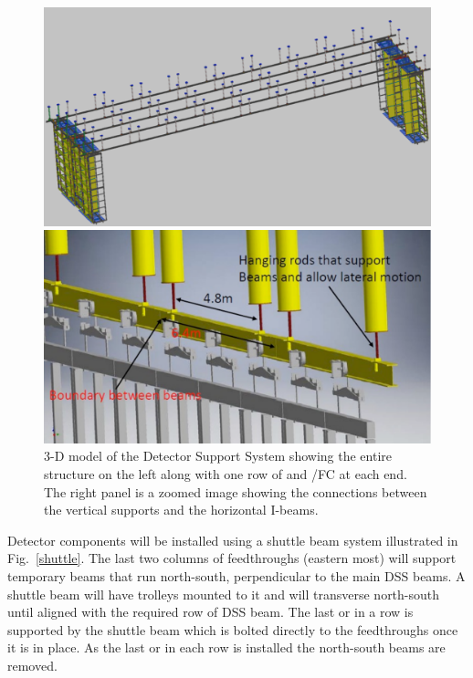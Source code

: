\begin{figure}[htbp]
\begin{center}
\begin{minipage}[c]{0.49\textwidth}
\includegraphics[width=\textwidth]{far-detector-single-phase/figures/DSS-1.pdf}
\end{minipage}
\begin{minipage}[c]{0.49\textwidth}
\includegraphics[width=\textwidth]{far-detector-single-phase/figures/DSS-2.pdf}
\end{minipage}
\caption{3-D model of the Detector Support System showing the entire structure on the left along with one row of  and /FC at each end. The right panel is a zoomed image showing the connections between the vertical supports and the horizontal I-beams.}
\label{DSS}
\end{center}
\end{figure}


Detector components will be installed using a shuttle beam system
illustrated in Fig.~\ref{shuttle}.  The last two columns of
feedthroughs (eastern most) will support temporary beams that run
north-south, perpendicular to the main DSS beams.  A shuttle beam
will have trolleys mounted to it and will transverse
north-south until aligned with the required row of DSS beam.  The last
 or  in a row is supported by the shuttle beam which is bolted
directly to the feedthroughs once it is in place.  As the last  or
 in each row is installed the north-south beams are removed.

